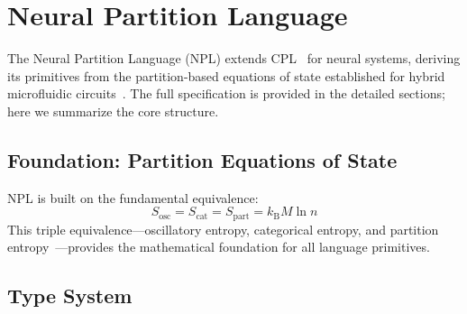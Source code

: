 \documentclass[aps,prd,twocolumn,superscriptaddress,floatfix,nofootinbib]{revtex4-2}
\theoremstyle{remark}
\newcommand{\kB}{k_{\mathrm{B}}}
\begin{document}
\section{Neural Partition Language}
\label{sec:language}

The Neural Partition Language (NPL) extends CPL~\cite{sachikonye2024cpl} for neural systems, deriving its primitives from the partition-based equations of state established for hybrid microfluidic circuits~\cite{sachikonye2024circuits,sachikonye2025partitionequations}. The full specification is provided in the detailed sections; here we summarize the core structure.

\subsection{Foundation: Partition Equations of State}

NPL is built on the fundamental equivalence:
\begin{equation}
\boxed{S_{\text{osc}} = S_{\text{cat}} = S_{\text{part}} = \kB M \ln n}
\end{equation}
This triple equivalence---oscillatory entropy, categorical entropy, and partition entropy~\cite{shannon1948mathematical,jaynes2003probability}---provides the mathematical foundation for all language primitives.

\subsection{Type System}
\end{document}

